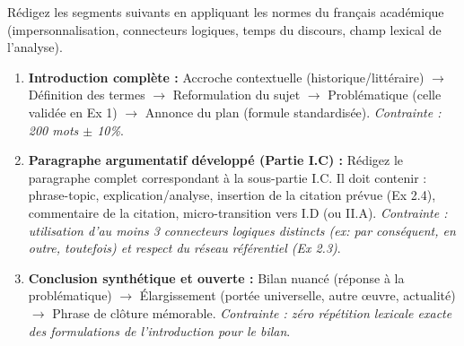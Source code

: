 \documentclass[11pt]{article}
\begin{document}
\begin{exercice}
Rédigez les segments suivants en appliquant les normes du français académique (impersonnalisation, connecteurs logiques, temps du discours, champ lexical de l'analyse).

\begin{enumerate}
    \item \textbf{Introduction complète :} Accroche contextuelle (historique/littéraire) $\rightarrow$ Définition des termes $\rightarrow$ Reformulation du sujet $\rightarrow$ Problématique (celle validée en Ex 1) $\rightarrow$ Annonce du plan (formule standardisée). \textit{Contrainte : 200 mots $\pm$ 10\%}.
    \item \textbf{Paragraphe argumentatif développé (Partie I.C) :} Rédigez le paragraphe complet correspondant à la sous-partie I.C. Il doit contenir : phrase-topic, explication/analyse, insertion de la citation prévue (Ex 2.4), commentaire de la citation, micro-transition vers I.D (ou II.A). \textit{Contrainte : utilisation d'au moins 3 connecteurs logiques distincts (ex: \textit{par conséquent, en outre, toutefois}) et respect du réseau référentiel (Ex 2.3)}.
    \item \textbf{Conclusion synthétique et ouverte :} Bilan nuancé (réponse à la problématique) $\rightarrow$ Élargissement (portée universelle, autre œuvre, actualité) $\rightarrow$ Phrase de clôture mémorable. \textit{Contrainte : zéro répétition lexicale exacte des formulations de l'introduction pour le bilan}.
\end{enumerate}
\end{exercice}
\end{document}
